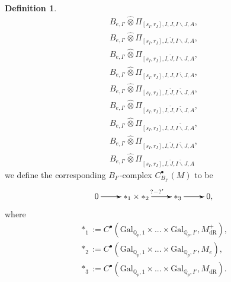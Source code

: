 \documentclass[12pt]{amsart}
\theoremstyle{definition}
\newtheorem{definition}[theorem]{Definition}
\numberwithin{equation}{section}
\begin{document}
\begin{definition}
\begin{align}
B_{e,I'}	\widehat{\otimes}\Pi_{[s_I,r_I],I,J,I\backslash J,A},\\	
B_{e,I'}	\widehat{\otimes}\Pi_{[s_I,r_I],I,\breve{J},I\backslash J,A},\\	
B_{e,I'}	\widehat{\otimes}\Pi_{[s_I,r_I],I,\widetilde{J},I\backslash J,A},\\
B_{e,I'}	\widehat{\otimes}\Pi_{[s_I,r_I],I,J,\breve{I\backslash J},A},\\	
B_{e,I'}	\widehat{\otimes}\Pi_{[s_I,r_I],I,\breve{J},\breve{I\backslash J},A},\\
B_{e,I'}	\widehat{\otimes}\Pi_{[s_I,r_I],I,\widetilde{J},\breve{I\backslash J},A},\\
B_{e,I'}	\widehat{\otimes}\Pi_{[s_I,r_I],I,J,\widetilde{I\backslash J},A},\\	
B_{e,I'}	\widehat{\otimes}\Pi_{[s_I,r_I],I,\breve{J},\widetilde{I\backslash J},A},\\
B_{e,I'} \widehat{\otimes}\Pi_{[s_I,r_I],I,\widetilde{J},\widetilde{I\backslash J},A}
\end{align}
we define the corresponding $B_{I'}$-complex $C^\bullet_{B_{I'}}(M)$ to be 
\[
\xymatrix@C+0pc@R+0pc{
0 \ar[r] \ar[r] \ar[r] &{*}_1 \times {*}_2  \ar[r]^{?-?'}\ar[r]\ar[r] &{*}_3\ar[r] \ar[r] \ar[r] &0,
}
\]
where
\begin{align}
*_1:=C^\bullet(\mathrm{Gal}_{\mathbb{Q}_p,1}\times...\times \mathrm{Gal}_{\mathbb{Q}_p,I'}, M^+_\mathrm{dR}),\\
*_2:=C^\bullet(\mathrm{Gal}_{\mathbb{Q}_p,1}\times...\times \mathrm{Gal}_{\mathbb{Q}_p,I'}, M_e),\\
*_3:=C^\bullet(\mathrm{Gal}_{\mathbb{Q}_p,1}\times...\times \mathrm{Gal}_{\mathbb{Q}_p,I'}, M_\mathrm{dR}).	
\end{align}



	
\end{definition}
\end{document}
